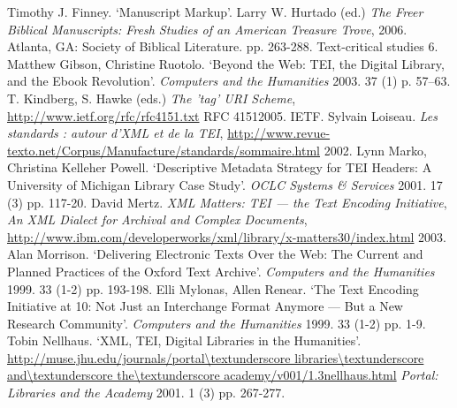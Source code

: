 \begin{bibitemlist}{1}
\label{Finney2006}Timothy J. Finney. ‘Manuscript Markup’. Larry W. Hurtado (ed.) \textit{The Freer Biblical Manuscripts: Fresh Studies of an American Treasure Trove}, 2006. Atlanta, GA: Society of Biblical Literature. pp. 263-288. Text-critical studies  6. 
\label{GibsonandRuotolo2003}Matthew Gibson, Christine Ruotolo. ‘Beyond the Web: TEI, the Digital Library, and the Ebook Revolution’.  \textit{Computers and the Humanities} 2003. 37  (1)  p. 57–63. 
\label{RFC4151}T. Kindberg, S. Hawke (eds.) \textit{The 'tag' URI Scheme},  \url{http://www.ietf.org/rfc/rfc4151.txt}  RFC 41512005. IETF. 
\label{Loiseaunodate}Sylvain Loiseau. \textit{Les standards : autour d'XML et de la TEI},  \url{http://www.revue-texto.net/Corpus/Manufacture/standards/sommaire.html} 2002. 
\label{MarkoandKelleher2001}Lynn Marko, Christina Kelleher Powell. ‘Descriptive Metadata Strategy for TEI Headers: A University of Michigan Library Case Study’.  \textit{OCLC Systems \& Services} 2001. 17  (3)  pp. 117-20. 
\label{Mertz2003}David Mertz. \textit{XML Matters: TEI — the Text Encoding Initiative}, \textit{  An XML Dialect for Archival and Complex Documents},  \url{http://www.ibm.com/developerworks/xml/library/x-matters30/index.html} 2003. 
\label{Morrison1999}Alan Morrison. ‘Delivering Electronic Texts Over the Web: The Current and Planned Practices of the Oxford Text Archive’.  \textit{Computers and the Humanities} 1999. 33  (1-2)  pp. 193-198. 
\label{MylonasandRenear1999}Elli Mylonas, Allen Renear. ‘The Text Encoding Initiative at 10: Not Just an Interchange Format Anymore — But a New Research Community’.  \textit{Computers and the Humanities} 1999. 33  (1-2)  pp. 1-9. 
\label{Nellhaus2001}Tobin Nellhaus. ‘XML, TEI, Digital Libraries in the Humanities’.  \url{http://muse.jhu.edu/journals/portal\textunderscore libraries\textunderscore and\textunderscore the\textunderscore academy/v001/1.3nellhaus.html} \textit{Portal: Libraries and the Academy} 2001. 1  (3)  pp. 267-277. 

\end{bibitemlist}
